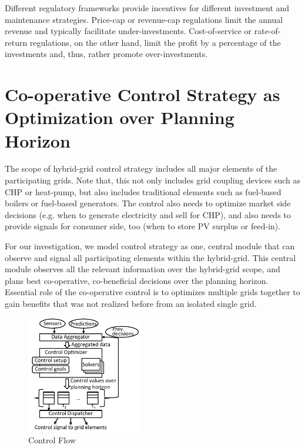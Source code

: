\documentclass[conference]{IEEEtran}
\begin{document}
Different regulatory frameworks provide incentives for different
investment and maintenance strategies. Price-cap or revenue-cap
regulations limit the annual revenue and typically facilitate
under-investments. Cost-of-service or rate-of-return regulations, on
the other hand, limit the profit by a percentage of the investments
and, thus, rather promote over-investments.

\section{Co-operative Control Strategy as 
Optimization over Planning Horizon}
\label{sec:control}

The scope of hybrid-grid control strategy includes all major elements
of the participating grids. Note that, this not only includes grid
coupling devices such as CHP or heat-pump, but also includes
traditional elements such as fuel-based boilers or fuel-based
generators. The control also needs to optimize market side decisions 
(e.g. when to generate electricity and sell for CHP), and also needs
to provide signals for consumer side, too (when to store PV surplus
or feed-in).  

For our investigation, we model control strategy as one, central
module that can observe and signal all participating elements within
the hybrid-grid. This central module observes all the relevant
information over the hybrid-grid scope, and plans best co-operative,
co-beneficial decisions over the planning horizon. Essential
role of the co-operative control is to optimizes multiple grids
together to gain benefits that was not realized before from an
isolated single grid. 

\begin{figure}[th]
  \centering
  \includegraphics[width=50mm]{figures/control_flow.pdf}
  \caption{Control Flow}
  \label{fig:control}
\end{figure}
\end{document}
